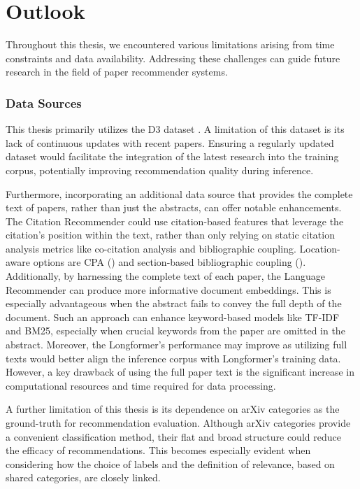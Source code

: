 \section{Outlook} \label{sec:outlook}

Throughout this thesis, we encountered various limitations arising from time constraints and data availability.
Addressing these challenges can guide future research in the field of paper recommender systems.

\subsubsection*{Data Sources}

This thesis primarily utilizes the D3 dataset \cite{WahleD3Massive2022}. A limitation of this dataset is its lack of continuous updates with recent papers. Ensuring a regularly updated dataset would facilitate the integration of the latest research into the training corpus, potentially improving recommendation quality during inference.

Furthermore, incorporating an additional data source that provides the complete text of papers, rather than just the abstracts, can offer notable enhancements.
The Citation Recommender could use citation-based features that leverage the citation's position within the text, rather than only relying on static citation analysis metrics like co-citation analysis and bibliographic coupling. Location-aware options are \ac{CPA} \cite{GippCitationProximity2009} () and section-based bibliographic coupling \cite{HabibSectionsbasedBibliographic2019} ().
Additionally, by harnessing the complete text of each paper, the Language Recommender can produce more informative document embeddings.
This is especially advantageous when the abstract fails to convey the full depth of the document.
Such an approach can enhance keyword-based models like TF-IDF and BM25, especially when crucial keywords from the paper are omitted in the abstract.
Moreover, the Longformer's performance may improve as utilizing full texts would better align the inference corpus with Longformer's training data.
However, a key drawback of using the full paper text is the significant increase in computational resources and time required for data processing.

A further limitation of this thesis is its dependence on arXiv categories as the ground-truth for recommendation evaluation.
Although arXiv categories provide a convenient classification method, their flat and broad structure could reduce the efficacy of recommendations.
This becomes especially evident when considering how the choice of labels and the definition of relevance, based on shared categories, are closely linked.

